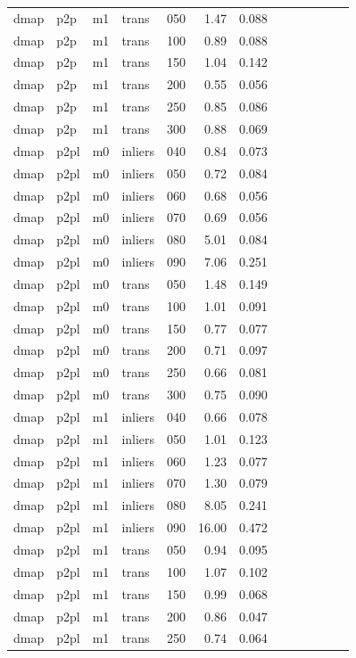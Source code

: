 \begin{table}[htbp]
\begin{tabular}{lllllrrrrrrrr}
  dmap & p2p & m1 & trans & 050 & 1.47 & 0.088 \\
  dmap & p2p & m1 & trans & 100 & 0.89 & 0.088 \\
  dmap & p2p & m1 & trans & 150 & 1.04 & 0.142 \\
  dmap & p2p & m1 & trans & 200 & 0.55 & 0.056 \\
  dmap & p2p & m1 & trans & 250 & 0.85 & 0.086 \\
  dmap & p2p & m1 & trans & 300 & 0.88 & 0.069 \\
  dmap & p2pl & m0 & inliers & 040 & 0.84 & 0.073 \\
  dmap & p2pl & m0 & inliers & 050 & 0.72 & 0.084 \\
  dmap & p2pl & m0 & inliers & 060 & 0.68 & 0.056 \\
  dmap & p2pl & m0 & inliers & 070 & 0.69 & 0.056 \\
  dmap & p2pl & m0 & inliers & 080 & 5.01 & 0.084 \\
  dmap & p2pl & m0 & inliers & 090 & 7.06 & 0.251 \\
  dmap & p2pl & m0 & trans & 050 & 1.48 & 0.149 \\
  dmap & p2pl & m0 & trans & 100 & 1.01 & 0.091 \\
  dmap & p2pl & m0 & trans & 150 & 0.77 & 0.077 \\
  dmap & p2pl & m0 & trans & 200 & 0.71 & 0.097 \\
  dmap & p2pl & m0 & trans & 250 & 0.66 & 0.081 \\
  dmap & p2pl & m0 & trans & 300 & 0.75 & 0.090 \\
  dmap & p2pl & m1 & inliers & 040 & 0.66 & 0.078 \\
  dmap & p2pl & m1 & inliers & 050 & 1.01 & 0.123 \\
  dmap & p2pl & m1 & inliers & 060 & 1.23 & 0.077 \\
  dmap & p2pl & m1 & inliers & 070 & 1.30 & 0.079 \\
  dmap & p2pl & m1 & inliers & 080 & 8.05 & 0.241 \\
  dmap & p2pl & m1 & inliers & 090 & 16.00 & 0.472 \\
  dmap & p2pl & m1 & trans & 050 & 0.94 & 0.095 \\
  dmap & p2pl & m1 & trans & 100 & 1.07 & 0.102 \\
  dmap & p2pl & m1 & trans & 150 & 0.99 & 0.068 \\
  dmap & p2pl & m1 & trans & 200 & 0.86 & 0.047 \\
  dmap & p2pl & m1 & trans & 250 & 0.74 & 0.064 \\

\end{tabular}
\end{table}
